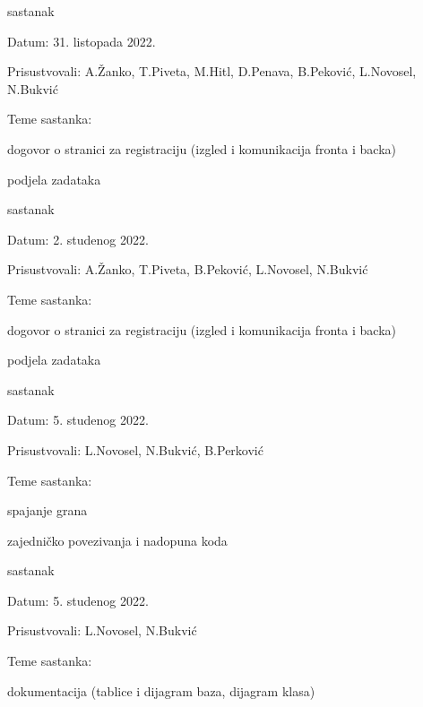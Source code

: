 \begin{packed_enum}
			\item  sastanak
			\item[] \begin{packed_item}
				\item Datum: 31. listopada 2022.
				\item Prisustvovali: A.Žanko, T.Piveta,  M.Hitl, D.Penava, B.Peković, L.Novosel, N.Bukvić
				\item Teme sastanka:
				\begin{packed_item}
				    \item  dogovor o stranici za registraciju (izgled i komunikacija fronta i backa)
				    \item  podjela zadataka
				\end{packed_item}
			\end{packed_item}
			
			\item  sastanak
			\item[] \begin{packed_item}
				\item Datum: 2. studenog 2022.
				\item Prisustvovali: A.Žanko, T.Piveta,  B.Peković, L.Novosel, N.Bukvić
				\item Teme sastanka:
				\begin{packed_item}
				    \item  dogovor o stranici za registraciju (izgled i komunikacija fronta i backa)
				    \item  podjela zadataka
				\end{packed_item}
			\end{packed_item}
			
			\item  sastanak
			\item[] \begin{packed_item}
				\item Datum: 5. studenog 2022.
				\item Prisustvovali: L.Novosel, N.Bukvić, B.Perković
				\item Teme sastanka:
				\begin{packed_item}
				    \item spajanje grana
				    \item zajedničko povezivanja i nadopuna koda
				\end{packed_item}
			\end{packed_item}
			
			\item  sastanak
			\item[] \begin{packed_item}
				\item Datum: 5. studenog 2022.
				\item Prisustvovali: L.Novosel, N.Bukvić
				\item Teme sastanka:
				\begin{packed_item}
				    \item dokumentacija (tablice i dijagram baza, dijagram klasa)
				\end{packed_item}
			\end{packed_item}
			

\end{packed_enum}
